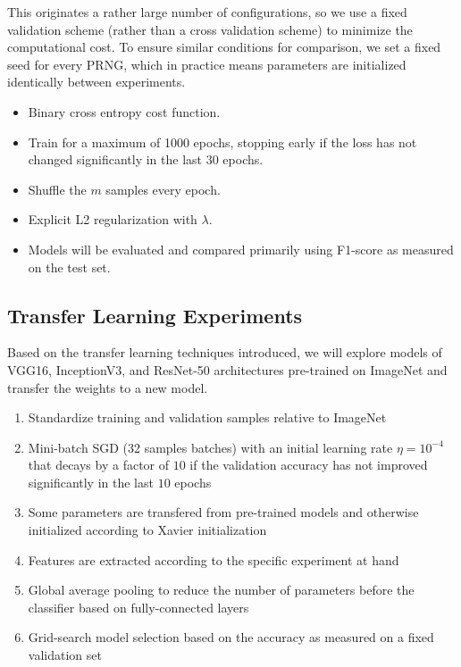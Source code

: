 This originates a rather large number of configurations, so we use a fixed validation scheme (rather than a cross validation scheme) to minimize the computational cost. To ensure similar conditions for comparison, we set a fixed seed for every \ac{PRNG}, which in practice means parameters are initialized identically between experiments.

\begin{itemize}
    \item Binary cross entropy cost function.
    \item Train for a maximum of 1000 epochs, stopping early if the loss has not changed significantly in the last $30$ epochs.
    \item Shuffle the $m$ samples every epoch.
    \item Explicit L2 regularization with $\lambda$.
    \item Models will be evaluated and compared primarily using F1-score as measured on the test set.
\end{itemize}

\subsection{Transfer Learning Experiments}

Based on the transfer learning techniques introduced, we will explore models of VGG16, InceptionV3, and ResNet-50 architectures pre-trained on ImageNet \cite{imagenet} and transfer the weights to a new model.

\begin{enumerate}
    \item Standardize training and validation samples relative to ImageNet
    \item Mini-batch \ac{SGD} (32 samples batches) with an initial learning rate $\eta = 10^{-4}$ that decays by a factor of $10$ if the validation accuracy has not improved significantly in the last $10$ epochs
    \item Some parameters are transfered from pre-trained models and otherwise initialized according to Xavier initialization
    \item Features are extracted according to the specific experiment at hand
    \item Global average pooling to reduce the number of parameters before the classifier based on fully-connected layers
    \item Grid-search model selection based on the accuracy as measured on a fixed validation set
\end{enumerate}

